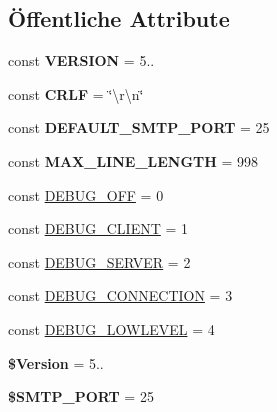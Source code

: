 \subsection*{Öffentliche Attribute}
\begin{DoxyCompactItemize}
\item 
\mbox{\label{class_s_m_t_p_a41fdd77beca2b15c059b4f214b5cbbc7}} 
const {\bfseries V\+E\+R\+S\+I\+ON} = \textquotesingle{}5..\textquotesingle{}
\item 
\mbox{\label{class_s_m_t_p_a243b2f12eee92be5a67bef4fcc30f207}} 
const {\bfseries C\+R\+LF} = \char`\"{}\textbackslash{}r\textbackslash{}n\char`\"{}
\item 
\mbox{\label{class_s_m_t_p_a947c8362d8a0b1a18b87279e3c109c94}} 
const {\bfseries D\+E\+F\+A\+U\+L\+T\+\_\+\+S\+M\+T\+P\+\_\+\+P\+O\+RT} = 25
\item 
\mbox{\label{class_s_m_t_p_affd1bb47a138d642d9860a96a63eac6e}} 
const {\bfseries M\+A\+X\+\_\+\+L\+I\+N\+E\+\_\+\+L\+E\+N\+G\+TH} = 998
\item 
const \mbox{\hyperlink{class_s_m_t_p_acb8c406fba86fbb2531dd98f22c6aeb1}{D\+E\+B\+U\+G\+\_\+\+O\+FF}} = 0
\item 
const \mbox{\hyperlink{class_s_m_t_p_ad58261e598847b386d3646cb1d8bc178}{D\+E\+B\+U\+G\+\_\+\+C\+L\+I\+E\+NT}} = 1
\item 
const \mbox{\hyperlink{class_s_m_t_p_a95ba76d2b5ef58318d4ac64eb0d2e981}{D\+E\+B\+U\+G\+\_\+\+S\+E\+R\+V\+ER}} = 2
\item 
const \mbox{\hyperlink{class_s_m_t_p_a61d2988ca01403ead2417bcf79ec5092}{D\+E\+B\+U\+G\+\_\+\+C\+O\+N\+N\+E\+C\+T\+I\+ON}} = 3
\item 
const \mbox{\hyperlink{class_s_m_t_p_a955e01b87400d0495c4ea3ba70228d89}{D\+E\+B\+U\+G\+\_\+\+L\+O\+W\+L\+E\+V\+EL}} = 4
\item 
\mbox{\label{class_s_m_t_p_afcbef3beaf3b796ded3f4e672719e06a}} 
{\bfseries \$\+Version} = \textquotesingle{}5..\textquotesingle{}
\item 
\mbox{\label{class_s_m_t_p_ab18d9e6b53ece65286ba6a83af7f9576}} 
{\bfseries \$\+S\+M\+T\+P\+\_\+\+P\+O\+RT} = 25
\item 
\mbox{\label{class_s_m_t_p_ab92088467c740f1c76ef8a54c30bd955}} 

\end{DoxyCompactItemize}
